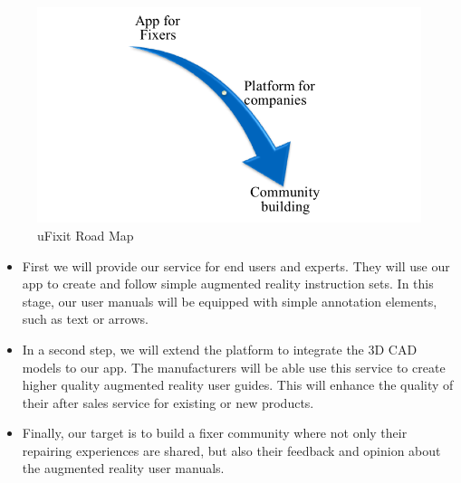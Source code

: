 \begin{figure}[H]
		\includegraphics[width=\textwidth]{../images/RoadMap.png}
		\centering
		\caption[uFixit Road Map]{uFixit Road Map}
		\label{fig:Road Map}
\end{figure}

\begin{itemize}
	\item First we will provide our service for end users and experts. They will use our app to create and follow simple augmented reality instruction sets. In this stage, our user manuals will be equipped with simple annotation elements, such as text or arrows.

	\item In a second step, we will extend the platform to integrate the 3D CAD models to our app. The manufacturers will be able use this service to create higher quality augmented reality user guides. This will enhance the quality of their after sales service for existing or new products.
	
	\item Finally, our target is to build a fixer community where not only their repairing experiences are shared, but also their feedback and opinion about the augmented reality user manuals. 
\end{itemize}

